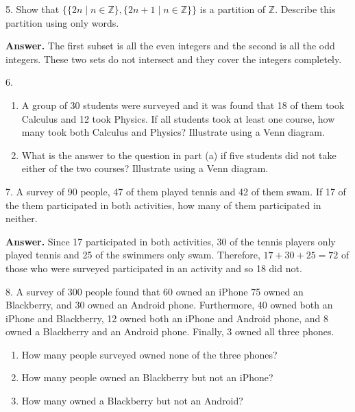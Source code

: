 \documentclass[10pt,]{book}
\theoremstyle{plain}
\theoremstyle{definition}
\theoremstyle{definition}
\theoremstyle{definition}
\begin{document}
\begin{exercisegroup}
\par\smallskip
\item[5.]\hypertarget{exercise-36}{} Show that \(\{\{2 n \mid n \in \mathbb{Z}\}, \{2 n + 1 \mid n \in \mathbb{Z}\}\}\) is a partition of \(\mathbb{Z}\). Describe this partition using only words.%
\par\smallskip
\par\smallskip
\noindent\textbf{Answer.}\hypertarget{answer-19}{}\quad
 The first subset is all the even integers and the second is all the odd integers.
These two sets do not intersect and they cover the integers completely.%
\item[6.]\hypertarget{exercise-37}{}
\leavevmode%
\begin{enumerate}[label=\alph*]
\item\hypertarget{li-52}{}A group of 30 students were surveyed and it was found that 18 of them took Calculus and 12 took Physics. If all students took at least one course, how many took both Calculus and Physics? Illustrate using a Venn diagram.%
\item\hypertarget{li-53}{}What is the answer to the question in part (a) if five students did not take either of the two courses? Illustrate using a Venn diagram.%
\end{enumerate}

%
\par\smallskip
\item[7.]\hypertarget{exercise-38}{}A survey of 90 people, 47 of them played tennis and 42 of them swam. If 17 of the them participated in both activities, how many of them participated in neither.%
\par\smallskip
\par\smallskip
\noindent\textbf{Answer.}\hypertarget{answer-20}{}\quad
Since 17 participated in both activities, 30 of the tennis players only played tennis and 25 of the swimmers only swam. Therefore, \(17+30+25=72\) of those who were surveyed participated in an activity and so 18 did not.%
\item[8.]\hypertarget{exercise-39}{}A survey of 300 people found that 60 owned an iPhone 75 owned an Blackberry, and 30 owned an Android phone. Furthermore, 40 owned both an iPhone and Blackberry, 12 owned both an iPhone and Android phone, and 8 owned a Blackberry and an Android phone. Finally, 3 owned all three phones.%
\par
\leavevmode%
\begin{enumerate}[label=\alph*]
\item\hypertarget{li-54}{} How many people surveyed owned none of the three phones?%
\item\hypertarget{li-55}{} How many people owned an Blackberry but not an iPhone?%
\item\hypertarget{li-56}{} How many owned a Blackberry but not an Android?%
\end{enumerate}
%
\par\smallskip
\end{exercisegroup}
\end{document}
